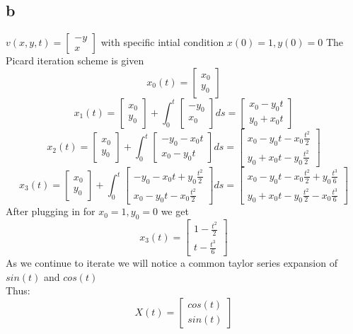 \documentclass{article}
\begin{document}
\subsection*{b}
$v(x,y,t) = \begin{bmatrix}
    -y\\
    x
\end{bmatrix}$ with specific intial condition $x(0) = 1, y(0) = 0$
The Picard iteration scheme is given
$$x_0(t) = \begin{bmatrix}
    x_0 \\
    y_0
\end{bmatrix}$$
$$x_1(t) = \begin{bmatrix}
    x_0 \\
    y_0
\end{bmatrix} + \int_0^t \begin{bmatrix}
    -y_0 \\
    x_0
\end{bmatrix} ds = \begin{bmatrix}
    x_0 - y_0t \\
    y_0 + x_0t
\end{bmatrix}$$
$$x_2(t) = \begin{bmatrix}
    x_0 \\
    y_0
\end{bmatrix} + \int_0^t \begin{bmatrix}
    -y_0 - x_0t \\
    x_0 - y_0t
\end{bmatrix} ds = \begin{bmatrix}
    x_0 - y_0t - x_0\frac{t^2}{2} \\
    y_0 + x_0t - y_0\frac{t^2}{2}
\end{bmatrix}$$
$$x_3(t) = \begin{bmatrix}
    x_0 \\
    y_0
\end{bmatrix} + \int_0^t \begin{bmatrix}
    -y_0 - x_0t + y_0\frac{t^2}{2} \\
    x_0 - y_0t - x_0\frac{t^2}{2}
\end{bmatrix} ds = \begin{bmatrix}
    x_0 - y_0t - x_0\frac{t^2}{2} + y_0\frac{t^3}{6} \\
    y_0 + x_0t - y_0\frac{t^2}{2} - x_0\frac{t^3}{6}
\end{bmatrix}$$
After plugging in for $x_0 = 1, y_0 = 0$ we get
$$x_3(t) = \begin{bmatrix}
    1 - \frac{t^2}{2} \\
    t - \frac{t^3}{6}
\end{bmatrix}$$
As we continue to iterate we will notice a common taylor series expansion of $sin(t)$ and $cos(t)$ \\
Thus:
$$X(t) = \begin{bmatrix}
    cos(t) \\
    sin(t)
\end{bmatrix}$$
\end{document}
